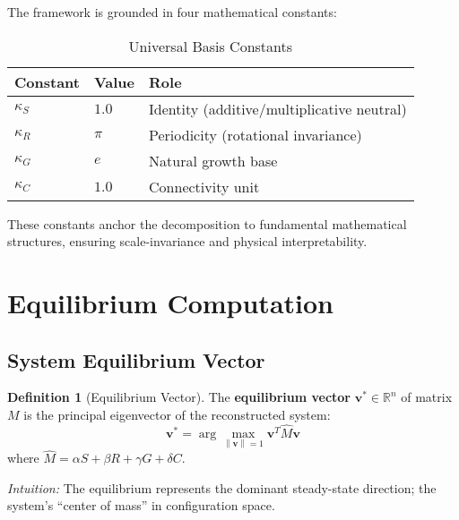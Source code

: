 \documentclass[11pt,a4paper]{article}
\theoremstyle{definition}
\newtheorem{definition}[theorem]{Definition}
\theoremstyle{remark}
\newcommand{\R}{\mathbb{R}}
\newcommand{\norm}[1]{\left\|#1\right\|}
\begin{document}
The framework is grounded in four mathematical constants:

\begin{table}[h]
\centering
\begin{tabular}{lll}
\toprule
\textbf{Constant} & \textbf{Value} & \textbf{Role} \\
\midrule
$\kappa_S$ & $1.0$ & Identity (additive/multiplicative neutral) \\
$\kappa_R$ & $\pi$ & Periodicity (rotational invariance) \\
$\kappa_G$ & $e$ & Natural growth base \\
$\kappa_C$ & $1.0$ & Connectivity unit \\
\bottomrule
\end{tabular}
\caption{Universal Basis Constants}
\label{tab:constants}
\end{table}

These constants anchor the decomposition to fundamental mathematical structures, ensuring scale-invariance and physical interpretability.

\section{Equilibrium Computation}

\subsection{System Equilibrium Vector}

\begin{definition}[Equilibrium Vector]\label{def:equilibrium}
The \textbf{equilibrium vector} $\mathbf{v}^* \in \R^n$ of matrix $M$ is the principal eigenvector of the reconstructed system:
\begin{equation}
\mathbf{v}^* = \arg\max_{\norm{\mathbf{v}}=1} \mathbf{v}^T \hat{M} \mathbf{v}
\end{equation}
where $\hat{M} = \alpha S + \beta R + \gamma G + \delta C$.
\end{definition}

\textit{Intuition:} The equilibrium represents the dominant steady-state direction; the system's ``center of mass'' in configuration space.
\end{document}
